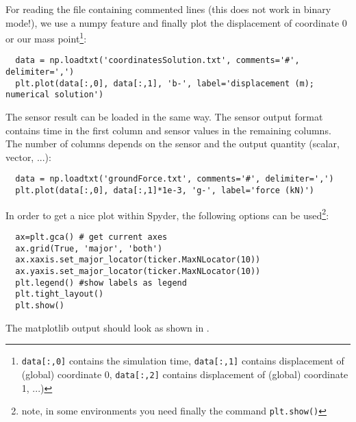 For reading the file containing commented lines (this does not work in binary mode!), we use a numpy feature and finally plot the displacement of coordinate 0 or our mass point\footnote{\texttt{data[:,0]} contains the simulation time, \texttt{data[:,1]} contains displacement of (global) coordinate 0, \texttt{data[:,2]} contains displacement of (global) coordinate 1, ...)}:
\pythonstyle\begin{lstlisting}
  data = np.loadtxt('coordinatesSolution.txt', comments='#', delimiter=',')
  plt.plot(data[:,0], data[:,1], 'b-', label='displacement (m); numerical solution') 
\end{lstlisting}
The sensor result can be loaded in the same way. The sensor output format contains time in the first column and sensor values in the remaining columns. The number of columns depends on the 
sensor and the output quantity (scalar, vector, ...):
\pythonstyle\begin{lstlisting}
  data = np.loadtxt('groundForce.txt', comments='#', delimiter=',')
  plt.plot(data[:,0], data[:,1]*1e-3, 'g-', label='force (kN)')
\end{lstlisting}
%
In order to get a nice plot within Spyder, the following options can be used\footnote{note, in some environments you need finally the command \texttt{plt.show()}}:
\pythonstyle\begin{lstlisting}
  ax=plt.gca() # get current axes
  ax.grid(True, 'major', 'both')
  ax.xaxis.set_major_locator(ticker.MaxNLocator(10))
  ax.yaxis.set_major_locator(ticker.MaxNLocator(10))
  plt.legend() #show labels as legend
  plt.tight_layout()
  plt.show() 
\end{lstlisting}
%
The matplotlib output should look as shown in .
%
%
%
%
%




